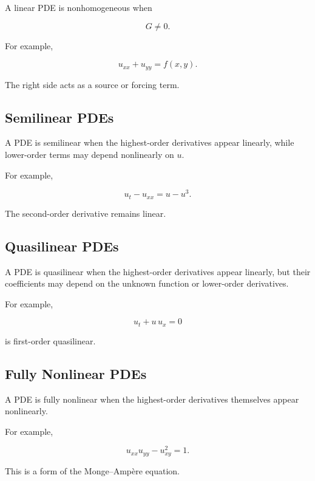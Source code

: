 A linear PDE is nonhomogeneous when

\[
\boxed{
G\neq0.
}
\]

For example,

\[
\boxed{
u_{xx}+u_{yy}
=
f(x,y).
}
\]

The right side acts as a source or forcing term.

\subsection{Semilinear PDEs}
\label{subsec:semilinear-pdes}

A PDE is semilinear when the highest-order derivatives appear linearly,
while lower-order terms may depend nonlinearly on \(u\).

For example,

\[
\boxed{
u_t-u_{xx}
=
u-u^3.
}
\]

The second-order derivative remains linear.

\subsection{Quasilinear PDEs}
\label{subsec:quasilinear-pdes}

A PDE is quasilinear when the highest-order derivatives appear linearly,
but their coefficients may depend on the unknown function or lower-order
derivatives.

For example,

\[
\boxed{
u_t
+
u\,u_x
=
0
}
\]

is first-order quasilinear.

\subsection{Fully Nonlinear PDEs}
\label{subsec:fully-nonlinear-pdes}

A PDE is fully nonlinear when the highest-order derivatives themselves
appear nonlinearly.

For example,

\[
\boxed{
u_{xx}u_{yy}
-
u_{xy}^2
=
1.
}
\]

This is a form of the Monge--Ampère equation.

